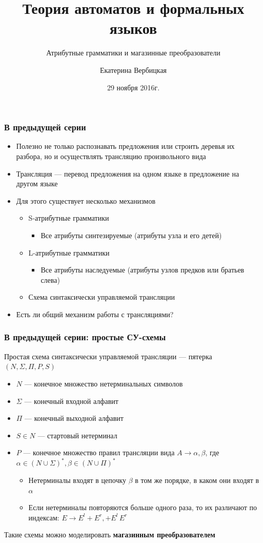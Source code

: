 \documentclass{beamer}
\title[]{Теория автоматов и формальных языков}
\subtitle[]{Атрибутные грамматики и магазинные преобразователи}
\institute[]{
Санкт-Петербургский государственный электротехнический университет <<ЛЭТИ>>\\
}
\author[]{Екатерина Вербицкая}
\date{29 ноября 2016г.}
\begin{document}
{
  \begin{frame}
    \titlepage
  \end{frame}
}

\begin{frame}[fragile]
  \transwipe[direction=90]
  \frametitle{В предыдущей серии}
  \begin{itemize}
    \item Полезно не только распознавать предложения или строить деревья их разбора, но и осуществлять трансляцию произвольного вида
    \item Трансляция --- перевод предложения на одном языке в предложение на другом языке
    \item Для этого существует несколько механизмов
    \begin{itemize}
      \item S-атрибутные грамматики
      \begin{itemize}
        \item Все атрибуты синтезируемые (атрибуты узла и его детей)
      \end{itemize}
      \item L-атрибутные грамматики
      \begin{itemize}
        \item Все атрибуты наследуемые (атрибуты узлов предков или братьев слева)
      \end{itemize}
      \item Схема синтаксически управляемой трансляции
    \end{itemize}
    \item Есть ли общий механизм работы с трансляциями?
  \end{itemize}
\end{frame}

\begin{frame}[fragile]
  \transwipe[direction=90]
  \frametitle{В предыдущей серии: простые СУ-схемы}
 Простая схема синтаксически управляемой трансляции --- пятерка $(N, \Sigma, \Pi, P, S)$  
  \begin{itemize}
    \item $N$ --- конечное множество нетерминальных символов
    \item $\Sigma$ --- конечный входной алфавит 
    \item $\Pi$ --- конечный выходной алфавит
    \item $S \in N$ --- стартовый нетерминал
    \item $P$ --- конечное множество правил трансляции вида $A \rightarrow \alpha, \beta$, где $\alpha \in (N \cup \Sigma)^*, \beta \in (N \cup \Pi)^*$
    \begin{itemize}
      \item Нетерминалы входят в цепочку $\beta$ в том же порядке, в каком они входят в $\alpha$
      \item Если нетерминалы повторяются больше одного раза, то их различают по индексам: $E \rightarrow E^l + E^r, + E^l \, E^r$
    \end{itemize}
  \end{itemize}
  
  Такие схемы можно моделировать \textbf{магазинным преобразователем}
\end{frame}
\end{document}

